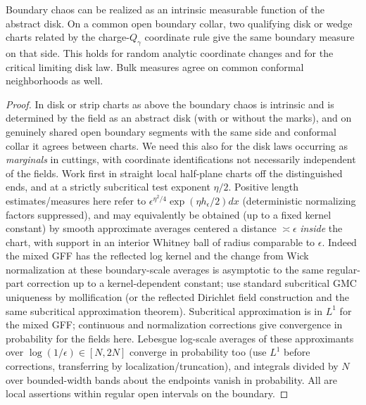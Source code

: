 \begin{lemma}\label{proxy:arc-covariance}
Boundary chaos can be realized as an intrinsic measurable function of the abstract disk.  On a common open boundary collar, two qualifying disk or wedge charts related by the charge-$Q_\gamma$ coordinate rule give the same boundary measure on that side.  This holds for random analytic coordinate changes and for the critical limiting disk law.  Bulk measures agree on common conformal neighborhoods as well.
\end{lemma}\begin{proof}


In disk or strip charts as above the boundary chaos is intrinsic and is determined by the field as an abstract disk (with or without the marks), and on genuinely shared open boundary segments with the same side and conformal collar it agrees between charts.
We need this also for the disk laws occurring as \emph{marginals} in cuttings, with coordinate identifications not necessarily independent of the fields.
Work first in straight local half-plane charts off the distinguished ends, and at a strictly subcritical test exponent \(\eta/2\).
Positive length estimates/measures here refer to \(\epsilon^{\eta^2/4}\exp(\eta h_\epsilon/2)dx\) (deterministic normalizing factors suppressed), and may equivalently be obtained (up to a fixed kernel constant) by smooth approximate averages centered a distance \(\asymp\epsilon\) \emph{inside} the chart, with support in an interior Whitney ball of radius comparable to \(\epsilon\).
Indeed the mixed GFF has the reflected log kernel and the change from Wick normalization at these boundary-scale averages is asymptotic to the same regular-part correction up to a kernel-dependent constant; use standard subcritical GMC uniqueness by mollification (or the reflected Dirichlet field construction and the same subcritical approximation theorem).
Subcritical approximation is in \(L^1\) for the mixed GFF; continuous and normalization corrections give convergence in probability for the fields here.
Lebesgue log-scale averages of these approximants over \(\log(1/\epsilon)\in[N,2N]\) converge in probability too (use \(L^1\) before corrections, transferring by localization/truncation), and integrals divided by \(N\) over bounded-width bands about the endpoints vanish in probability.
All are local assertions within regular open intervals on the boundary.



\end{proof}
